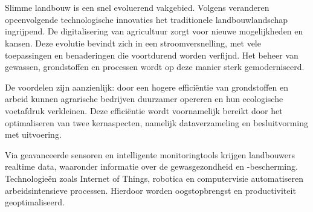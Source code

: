 \chapter{}%
\label{ch:stand-van-zaken}






Slimme landbouw is een snel evoluerend vakgebied. Volgens \textcite{Karunathilake2023} veranderen opeenvolgende technologische innovaties het traditionele landbouwlandschap ingrijpend. De digitalisering van agricultuur zorgt voor nieuwe mogelijkheden en kansen. Deze evolutie bevindt zich in een stroomversnelling, met vele toepassingen en benaderingen die voortdurend worden verfijnd. Het beheer van gewassen, grondstoffen en processen wordt op deze manier sterk gemoderniseerd. 

De voordelen zijn aanzienlijk: door een hogere efficiëntie van grondstoffen en arbeid kunnen agrarische bedrijven duurzamer opereren en hun ecologische voetafdruk verkleinen. Deze efficiëntie wordt voornamelijk bereikt door het optimaliseren van twee kernaspecten, namelijk dataverzameling en besluitvorming met uitvoering.

Via geavanceerde sensoren en intelligente monitoringtools krijgen landbouwers realtime data, waaronder informatie over de gewasgezondheid en -bescherming. Technologieën zoals Internet of Things, robotica en computervisie automatiseren arbeidsintensieve processen. Hierdoor worden oogstopbrengst en productiviteit geoptimaliseerd.

